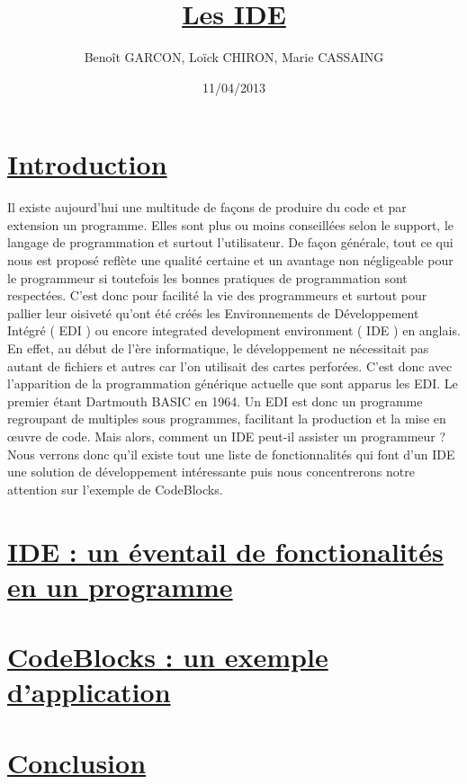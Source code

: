 \documentclass[a4paper, 12pt]{article} \usepackage [frenchb]{babel} \usepackage{color} \usepackage[utf8]{inputenc}
\title{\underline{\textbf{Les IDE}}} \author{Benoît GARCON, Loïck CHIRON, Marie CASSAING} \date{11/04/2013}
\begin{document}
 \pagecolor{bleuciel}

\maketitle \vspace {4cm}

\tableofcontents \thispagestyle{empty}

\newpage \section*{\underline{Introduction}} 

	Il existe aujourd'hui une multitude de façons de produire du code et par extension un programme. Elles sont plus ou moins conseillées selon le support, le langage de programmation et surtout l'utilisateur. De façon générale, tout ce qui nous est proposé reflète une qualité certaine et un avantage non négligeable pour le programmeur si toutefois les bonnes pratiques de programmation sont respectées.
	C'est donc pour facilité la vie des programmeurs et surtout pour pallier leur oisiveté qu'ont été créés les Environnements de Développement Intégré ( EDI ) ou encore integrated development environment ( IDE ) en anglais. En effet, au début de l'ère informatique, le développement ne nécessitait pas autant de fichiers et autres car l'on utilisait des cartes perforées. C'est donc avec l'apparition de la programmation générique actuelle que sont apparus les EDI. Le premier étant Dartmouth BASIC en 1964.
	Un EDI est donc un programme regroupant de multiples sous programmes, facilitant la production et la mise en œuvre de code. Mais alors, comment un IDE peut-il assister un programmeur ?
	Nous verrons donc qu'il existe tout une liste de fonctionnalités qui font d'un IDE une solution de développement intéressante puis nous concentrerons notre attention sur l'exemple de CodeBlocks.


\newpage \section{\underline{IDE : un éventail de fonctionalités en un programme}}

\newpage \section{\underline{CodeBlocks : un exemple d'application}}

\newpage \section*{\underline{Conclusion}}  
\end{document}
